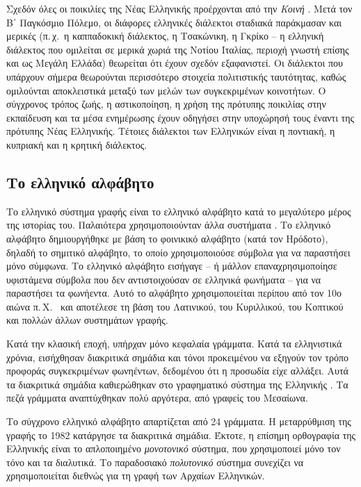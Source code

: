 \documentclass[]{../../metanetpaper}
\begin{document}
\begin{multicols}{2}
Σχεδόν όλες οι ποικιλίες της Νέας Ελληνικής προέρχονται από την \textit{Κοινή} \cite{Bro1}. Μετά τον Β΄ Παγκόσμιο Πόλεμο, οι διάφορες ελληνικές διάλεκτοι σταδιακά παράκμασαν και μερικές (π.\,χ.~η καππαδοκική διάλεκτος, η Τσακώνικη, η Γκρίκο – η ελληνική διάλεκτος που ομιλείται σε μερικά χωριά της Νοτίου Ιταλίας, περιοχή γνωστή επίσης και ως Μεγάλη Ελλάδα) θεωρείται ότι έχουν σχεδόν εξαφανιστεί. Οι διάλεκτοι που υπάρχουν σήμερα θεωρούνται περισσότερο στοιχεία πολιτιστικής ταυτότητας, καθώς ομιλούνται αποκλειστικά μεταξύ των μελών  των συγκεκριμένων κοινοτήτων. Ο σύγχρονος τρόπος ζωής, η αστικοποίηση, η χρήση της πρότυπης ποικιλίας στην εκπαίδευση και τα μέσα ενημέρωσης έχουν οδηγήσει στην υποχώρησή τους έναντι της πρότυπης Νέας Ελληνικής. Τέτοιες διάλεκτοι των Ελληνικών είναι η ποντιακή, η κυπριακή και η κρητική διάλεκτος. 

\subsection{Το ελληνικό αλφάβητο}

Το ελληνικό σύστημα γραφής είναι το ελληνικό αλφάβητο κατά το μεγαλύτερο μέρος της ιστορίας του. Παλαιότερα χρησιμοποιούνταν άλλα συστήματα \cite{Kopi1}. Το ελληνικό αλφάβητο δημιουργήθηκε με βάση το φοινικικό αλφάβητο (κατά τον Ηρόδοτο), δηλαδή το σημιτικό αλφάβητο, το οποίο χρησιμοποιούσε σύμβολα για να παραστήσει μόνο σύμφωνα. Το ελληνικό αλφάβητο εισήγαγε – ή μάλλον επαναχρησιμοποίησε υφιστάμενα σύμβολα που δεν αντιστοιχούσαν σε ελληνικά φωνήματα – για να παραστήσει τα φωνήεντα. Αυτό το αλφάβητο χρησιμοποιείται περίπου από τον 10ο αιώνα π.\,Χ.~\cite{Tonn1} και αποτέλεσε τη βάση του Λατινικού, του Κυριλλικού, του Κοπτικού και πολλών άλλων συστημάτων γραφής.

Κατά την κλασική εποχή, υπήρχαν μόνο κεφαλαία γράμματα. Κατά τα ελληνιστικά χρόνια, εισήχθησαν διακριτικά σημάδια και τόνοι προκειμένου να εξηγούν τον τρόπο προφοράς συγκεκριμένων φωνηέντων, δεδομένου ότι η προσωδία είχε αλλάξει. Αυτά τα διακριτικά σημάδια καθιερώθηκαν στο γραφηματικό  σύστημα της Ελληνικής \cite{Chris1}. Τα πεζά γράμματα αναπτύχθηκαν πολύ αργότερα, από γραφείς του Μεσαίωνα.

Το σύγχρονο ελληνικό αλφάβητο απαρτίζεται από 24 γράμματα. Η μεταρρύθμιση της γραφής το 1982 κατάργησε τα διακριτικά σημάδια. Έκτοτε, η επίσημη ορθογραφία της Ελληνικής είναι το απλοποιημένο \textit{μονοτονικό} σύστημα, που χρησιμοποιεί μόνο τον τόνο και τα διαλυτικά. Το παραδοσιακό \textit{πολυτονικό} σύστημα συνεχίζει να χρησιμοποιείται διεθνώς για τη γραφή των Αρχαίων Ελληνικών.


\end{multicols}
\end{document}
